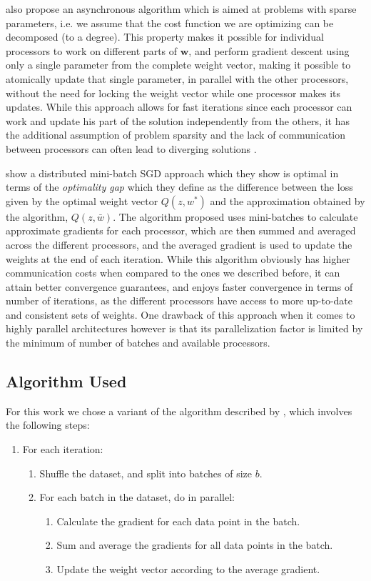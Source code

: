 \documentclass[11pt,a4paper]{article}
\newcommand{\Wb}{\mathbf{w}}
\begin{document}
\cite{recht2011hogwild} also propose an asynchronous algorithm which is aimed at problems with
sparse parameters, i.e. we assume that the cost function we are optimizing can be decomposed (to a
degree). This property makes it possible for individual processors to work on different parts of
$\Wb$, and perform gradient descent using only a single parameter from the complete weight vector,
making it possible to atomically update that single parameter, in parallel with the other
processors, without the need for locking the weight vector while one processor makes its updates.
While this approach allows for fast iterations since each processor can work and update his part of
the solution independently from the others, it has the additional assumption of problem sparsity
and the lack of communication between processors can often lead to diverging solutions
\cite{dai2015analysis}.

\cite{dekel2012optimal} show a distributed mini-batch SGD approach which they show is optimal in
terms of the \textit{optimality gap} which they define as the difference between the loss given by
the optimal weight vector $Q(z, w^*)$ and the approximation obtained by the algorithm, $Q(z,
\bar{w})$. The algorithm proposed uses mini-batches to calculate approximate gradients for each
processor, which are then summed and averaged across the different processors, and the averaged
gradient is used to update the weights at the end of each iteration. While this algorithm obviously
has higher communication costs when compared to the ones we described before, it can attain better
convergence guarantees, and enjoys faster convergence in terms of number of iterations, as the
different processors have access to more up-to-date and consistent sets of weights. One drawback of
this approach when it comes to highly parallel architectures however is that its parallelization
factor is limited by the minimum of number of batches and available processors.

\subsection{Algorithm Used}

For this work we chose a variant of the algorithm described by \cite{dekel2012optimal}, which involves the following steps:

\begin{enumerate}
	\item  	For each iteration:
	\begin{enumerate}
		\item Shuffle the dataset, and split into batches of size $b$.
		\item For each batch in the dataset, do in parallel:
		\begin{enumerate}
			\item Calculate the gradient for each data point in the batch.
			\item Sum and average the gradients for all data points in the batch.
			\item Update the weight vector according to the average gradient.
		\end{enumerate}
	\end{enumerate}
\end{enumerate}
\end{document}
